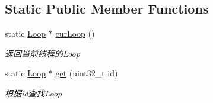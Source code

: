 \subsection*{Static Public Member Functions}
\begin{DoxyCompactItemize}
\item 
static \hyperlink{classec_1_1Loop}{Loop} $\ast$ \hyperlink{classec_1_1Loop_abb797bdabdefdff5b6cc3f2b1b249747}{cur\-Loop} ()
\begin{DoxyCompactList}\small\item\em 返回当前线程的\-Loop \end{DoxyCompactList}\item 
static \hyperlink{classec_1_1Loop}{Loop} $\ast$ \hyperlink{classec_1_1Loop_a459fada2bbc382637fab88b3ce914d46}{get} (uint32\-\_\-t id)
\begin{DoxyCompactList}\small\item\em 根据id查找\-Loop \end{DoxyCompactList}\end{DoxyCompactItemize}
